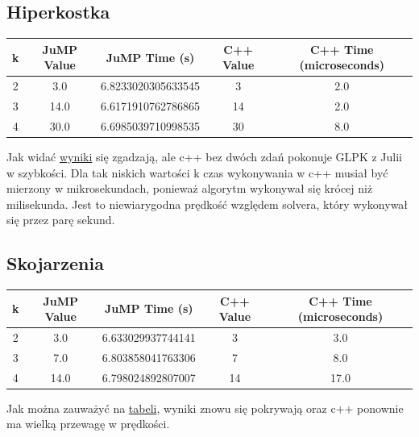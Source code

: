 \documentclass{article}
\begin{document}
\subsection{Hiperkostka}
\begin{table}[H]
    \begin{tabular}{|c|c|c|c|c|}
    \hline
    k & JuMP Value & JuMP Time (s) & C++ Value & C++ Time (microseconds) \\
    \hline
    2 & 3.0 & 6.8233020305633545 & 3 & 2.0 \\
    \hline
    3 & 14.0 & 6.6171910762786865 & 14 & 2.0 \\
    \hline
    4 & 30.0 & 6.6985039710998535 & 30 & 8.0 \\
    \hline
    \end{tabular}
    \label{tab:comp_1}
\end{table}

    Jak widać \hyperref[tab:comp_1]{wyniki} się zgadzają, ale c++ bez dwóch zdań pokonuje GLPK z Julii w szybkości. Dla tak niskich wartości k czas wykonywania w c++ musiał być mierzony w mikrosekundach, ponieważ algorytm wykonywał się krócej niż milisekunda. Jest to niewiarygodna prędkość względem solvera, który wykonywał się przez parę sekund.

\subsection{Skojarzenia}
\begin{table}[H]
    \begin{tabular}{|c|c|c|c|c|}
    \hline
    k & JuMP Value & JuMP Time (s) & C++ Value & C++ Time (microseconds) \\
    \hline
    2 & 3.0 & 6.633029937744141 & 3 & 3.0 \\
    \hline
    3 & 7.0 & 6.803858041763306 & 7 & 8.0 \\
    \hline
    4 & 14.0 & 6.798024892807007 & 14 & 17.0 \\
    \hline
    \end{tabular}
    \label{tab:comp_2}
\end{table}

    Jak można zauważyć na \hyperref[tab:comp_2]{tabeli}, wyniki znowu się pokrywają oraz c++ ponownie ma wielką przewagę w prędkości.
\end{document}
